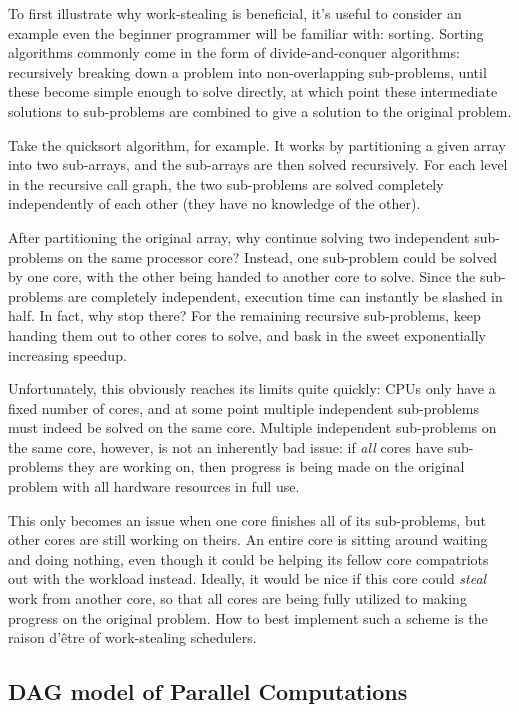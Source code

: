 \documentclass[bsc,frontabs,singlespacing,parskip,deptreport,normalheadings]{infthesis}
\begin{document}
To first illustrate why work-stealing is beneficial, it's useful to consider an
example even the beginner programmer will be familiar with: sorting. Sorting
algorithms commonly come in the form of divide-and-conquer algorithms:
recursively breaking down a problem into non-overlapping sub-problems, until
these become simple enough to solve directly, at which point these intermediate
solutions to sub-problems are combined to give a solution to the original
problem.

Take the quicksort algorithm, for example. It works by partitioning a given
array into two sub-arrays, and the sub-arrays are then solved recursively. For
each level in the recursive call graph, the two sub-problems are solved
completely independently of each other (they have no knowledge of the other).

After partitioning the original array, why continue solving two independent
sub-problems on the same processor core? Instead, one sub-problem could be
solved by one core, with the other being handed to another core to solve. Since
the sub-problems are completely independent, execution time can instantly be
slashed in half. In fact, why stop there? For the remaining recursive
sub-problems, keep handing them out to other cores to solve, and bask in the
sweet exponentially increasing speedup.

Unfortunately, this obviously reaches its limits quite quickly: CPUs only have a
fixed number of cores, and at some point multiple independent sub-problems must
indeed be solved on the same core. Multiple independent sub-problems on the
same core, however, is not an inherently bad issue: if \textit{all} cores have
sub-problems they are working on, then progress is being made on the original
problem with all hardware resources in full use.

This only becomes an issue when one core finishes all of its sub-problems, but
other cores are still working on theirs. An entire core is sitting around
waiting and doing nothing, even though it could be helping its fellow core
compatriots out with the workload instead. Ideally, it would be nice if this
core could \textit{steal} work from another core, so that all cores are being
fully utilized to making progress on the original problem. How to best implement
such a scheme is the raison d'être of work-stealing schedulers.

\subsection{DAG model of Parallel Computations}
\end{document}
